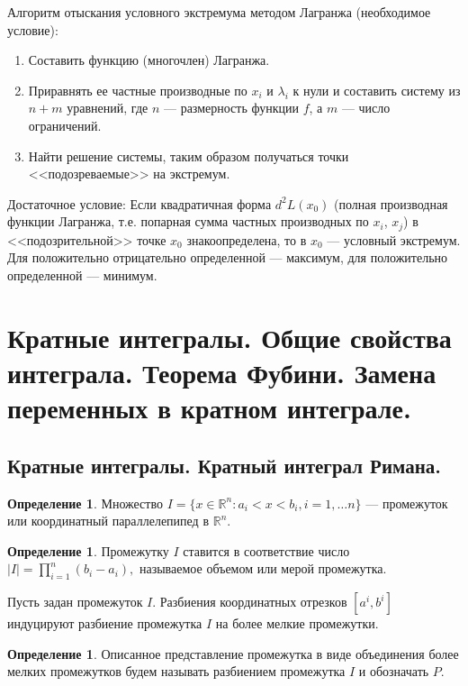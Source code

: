 \documentclass[12pt]{report}
\theoremstyle{definition}
\newtheorem{definition}[theorem]{Определение}
\newcommand{\R}{\mathbb R}
\begin{document}
Алгоритм отыскания условного экстремума методом Лагранжа (необходимое условие):
\begin{enumerate}
\item Составить функцию (многочлен) Лагранжа.
\item Приравнять ее частные производные по $x_i$ и $\lambda_i$ к нули и составить систему
из $n + m$ уравнений, где $n$ --- размерность функции $f$, а $m$ --- число ограничений.
\item Найти решение системы, таким образом получаться точки <<подозреваемые>> на экстремум.
\end{enumerate}

Достаточное условие:
Если квадратичная форма $d^2 L(x_0)$ (полная производная функции Лагранжа, т.е. попарная сумма
частных производных по $x_i$, $x_j$) в <<подозрительной>> точке $x_0$ знакоопределена, то в
$x_0$ --- условный экстремум. Для положительно отрицательно определенной --- максимум, для
положительно определенной --- минимум.


\section{Кратные интегралы. Общие свойства интеграла. Теорема Фубини. Замена переменных в кратном интеграле.}
\subsection{Кратные интегралы. Кратный интеграл Римана.}
\begin{definition}
Множество $I = \{x \in \R^n: a_i < x < b_i, i=1, \dots n\}$ --- промежуток или координатный
параллелепипед в $\R^n$.
\end{definition}

\begin{definition}
Промежутку $I$ ставится в соответствие число $|I| = \prod\limits_{i=1}^n (b_i - a_i),$
называемое объемом или мерой промежутка.
\end{definition}

Пусть задан промежуток $I$. Разбиения координатных отрезков $[a^i, b^i]$ индуцируют
разбиение промежутка $I$ на более мелкие промежутки.

\begin{definition}
Описанное представление промежутка в виде объединения более мелких промежутков будем
называть разбиением промежутка $I$ и обозначать $P$.
\end{definition}
\end{document}
